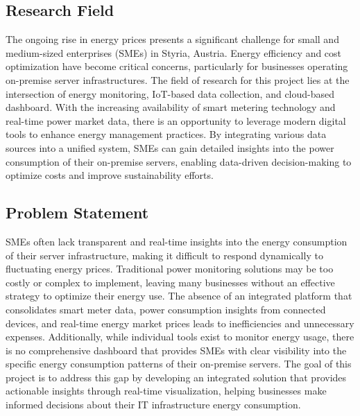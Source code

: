 \subsection{Research Field}
The ongoing rise in energy prices presents a significant challenge for small and medium-sized enterprises (SMEs) in Styria, Austria. 
Energy efficiency and cost optimization have become critical concerns, particularly for businesses operating on-premise server infrastructures. 
The field of research for this project lies at the intersection of energy monitoring, IoT-based data collection, and cloud-based dashboard. 
With the increasing availability of smart metering technology and real-time power market data, there is an opportunity to leverage modern digital tools to enhance energy management practices. 
By integrating various data sources into a unified system, SMEs can gain detailed insights into the power consumption of their on-premise servers, 
enabling data-driven decision-making to optimize costs and improve sustainability efforts.

\subsection{Problem Statement}

SMEs often lack transparent and real-time insights into the energy consumption of their server infrastructure, making it difficult to respond dynamically to fluctuating energy prices. 
Traditional power monitoring solutions may be too costly or complex to implement, leaving many businesses without an effective strategy to optimize their energy use. 
The absence of an integrated platform that consolidates smart meter data, power consumption insights from connected devices, and real-time energy market prices leads to inefficiencies and unnecessary expenses. 
Additionally, while individual tools exist to monitor energy usage, there is no comprehensive dashboard that provides SMEs with clear visibility 
into the specific energy consumption patterns of their on-premise servers. 
The goal of this project is to address this gap by developing an integrated solution that provides actionable insights through real-time visualization, 
helping businesses make informed decisions about their IT infrastructure energy consumption.

